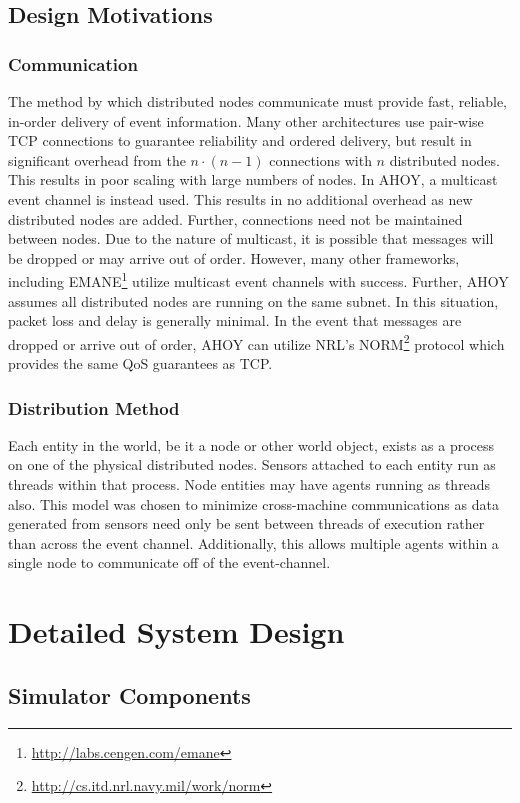 \documentclass[titlepage]{article}
\begin{document}
\subsection{Design Motivations}
\subsubsection{Communication}
The method by which distributed nodes communicate must provide fast, reliable, in-order delivery of event information.  Many other architectures use pair-wise TCP connections to guarantee reliability and ordered delivery, but result in significant overhead from the $n \cdot (n-1)$ connections with $n$ distributed nodes.  This results in poor scaling with large numbers of nodes.  In AHOY, a multicast event channel is instead used.  This results in no additional overhead as new distributed nodes are added.  Further, connections need not be maintained between nodes.  Due to the nature of multicast, it is possible that messages will be dropped or may arrive out of order.  However, many other frameworks, including EMANE\footnote{\url{http://labs.cengen.com/emane}} utilize multicast event channels with success.  Further, AHOY assumes all distributed nodes are running on the same subnet. In this situation, packet loss and delay is generally minimal.  In the event that messages are dropped or arrive out of order, AHOY can utilize NRL's NORM\footnote{\url{http://cs.itd.nrl.navy.mil/work/norm}} protocol which provides the same QoS guarantees as TCP.

\subsubsection{Distribution Method}
Each entity in the world, be it a node or other world object, exists as a process on one of the physical distributed nodes.  Sensors attached to each entity run as threads within that process.  Node entities may have agents running as threads also.  This model was chosen to minimize cross-machine communications as data generated from sensors need only be sent between threads of execution rather than across the event channel.  Additionally, this allows multiple agents within a single node to communicate off of the event-channel.

\section{Detailed System Design}

\subsection{Simulator Components}
\end{document}
